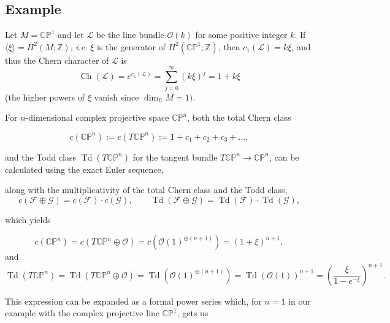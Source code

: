 \documentclass[11pt]{amsart}
\newcommand{\ie}{\emph{i.e.} }
\newcommand{\ra}{\rightarrow}
\newcommand{\lbracket}{\left(}
\newcommand{\rbracket}{\right)}
\newcommand{\PP}{\mathbb{P}}
\newcommand{\CC}{\mathbb{C}}
\newcommand{\ZZ}{\mathbb{Z}}
\newcommand{\mcF}{\mathcal{F}}
\newcommand{\mcG}{\mathcal{G}}
\newcommand{\mcL}{\mathcal{L}}
\newcommand{\mcO}{\mathcal{O}}
\DeclareMathOperator{\Td}{Td}
\DeclareMathOperator{\Ch}{Ch}
\begin{document}
\subsection*{Example}

Let $M = \CC\PP^{1}$ and let $\mcL$ be the line bundle $\mcO(k)$ for some positive integer $k$. If $\langle \xi \rangle = H^{2}(M; \ZZ)$, \ie $\xi$ is the generator of $H^{2}(\CC\PP^{1}; \ZZ)$, then $c_{1}(\mcL) = k\xi$, and thus the Chern character of $\mcL$ is
\begin{equation*}
	\Ch(\mcL) = e^{c_{1}(\mcL)} = \sum_{j=0}^{\infty} (k\xi)^{j} = 1 + k\xi
\end{equation*}
(the higher powers of $\xi$ vanish since $\dim_{\CC} M = 1)$.
	
For $n$-dimensional complex projective space $\CC\PP^{n}$, both the total Chern class 

\begin{equation*}
	c(\CC\PP^{n}) := c(T\CC\PP^{n}) := 1 + c_{1} + c_{2} + c_{3} + \ldots,
\end{equation*}

and the Todd class $\Td(T\CC\PP^{n})$ for the tangent bundle $T\CC\PP^{n} \ra \CC\PP^{n}$, can be calculated using the exact Euler sequence,
\begin{figure}[h!]
\end{figure}
along with the multiplicativity of the total Chern class and the Todd class,
\begin{equation*}
	c(\mcF \oplus \mcG) = c(\mcF)\cdot c(\mcG), \qquad \Td(\mcF \oplus \mcG) = \Td(\mcF) \cdot \Td(\mcG),
\end{equation*}

which yields

\begin{equation*}
	c(\CC\PP^{n}) = c(T\CC\PP^{n} \oplus \mcO) = c(\mcO(1)^{\oplus(n+1)}) = (1 + \xi)^{n+1},
\end{equation*}
and
\begin{equation*}
	\Td(T\CC\PP^{n}) = \Td(T\CC\PP^{n} \oplus \mcO ) = \Td(\mcO(1)^{\oplus (n+1)}) = \Td\lbracket\mcO(1)\rbracket^{n+1} = \lbracket \frac{\xi}{1 - e^{-\xi}} \rbracket^{n+1}.
\end{equation*}
	
This expression can be expanded as a formal power series which, for $n = 1$ in our example with the complex projective line $\CC\PP^{1}$, gets us
\end{document}
